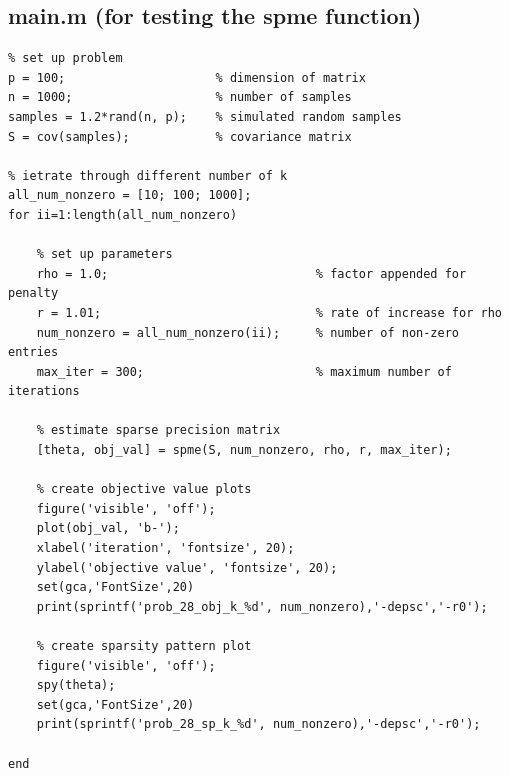\documentclass{scrartcl}
\begin{document}
\subsection*{main.m (for testing the spme function)}

\begin{verbatim}
% set up problem
p = 100;                     % dimension of matrix
n = 1000;                    % number of samples
samples = 1.2*rand(n, p);    % simulated random samples
S = cov(samples);            % covariance matrix

% ietrate through different number of k
all_num_nonzero = [10; 100; 1000];
for ii=1:length(all_num_nonzero)
    
    % set up parameters
    rho = 1.0;                             % factor appended for penalty
    r = 1.01;                              % rate of increase for rho
    num_nonzero = all_num_nonzero(ii);     % number of non-zero entries
    max_iter = 300;                        % maximum number of iterations
    
    % estimate sparse precision matrix
    [theta, obj_val] = spme(S, num_nonzero, rho, r, max_iter);

    % create objective value plots
    figure('visible', 'off');
    plot(obj_val, 'b-');
    xlabel('iteration', 'fontsize', 20);
    ylabel('objective value', 'fontsize', 20);
    set(gca,'FontSize',20)
    print(sprintf('prob_28_obj_k_%d', num_nonzero),'-depsc','-r0');
    
    % create sparsity pattern plot
    figure('visible', 'off');
    spy(theta);
    set(gca,'FontSize',20)
    print(sprintf('prob_28_sp_k_%d', num_nonzero),'-depsc','-r0');

end
\end{verbatim}
\end{document}
